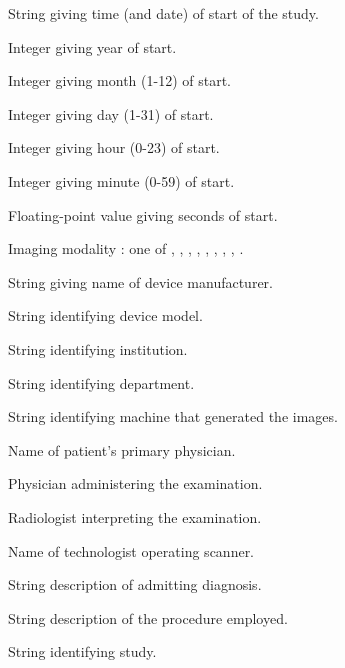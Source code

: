\documentclass{article}
\begin{document}
\begin{description}
   \item [] String giving time (and date) of start
      of the study.
   \item [] Integer giving year of start.
   \item [] Integer giving month (1-12) of start.
   \item [] Integer giving day (1-31) of start.
   \item [] Integer giving hour (0-23) of start.
   \item [] Integer giving minute (0-59) of start.
   \item [] Floating-point value giving seconds
      of start.
   \item [] Imaging modality : one of ,
      , , ,
      , , , ,
      .
   \item [] String giving name of device
      manufacturer.
   \item [] String identifying device model.
   \item [] String identifying institution.
   \item [] String identifying department.
   \item [] String identifying machine that generated
      the images.
   \item [] Name of patient's primary
      physician.
   \item [] Physician administering the
      examination.
   \item [] Radiologist interpreting the examination.
   \item [] Name of technologist operating scanner.
   \item [] String description of admitting
      diagnosis. 
   \item [] String description of the procedure employed.
   \item [] String identifying study.
\end{description}
\end{document}
